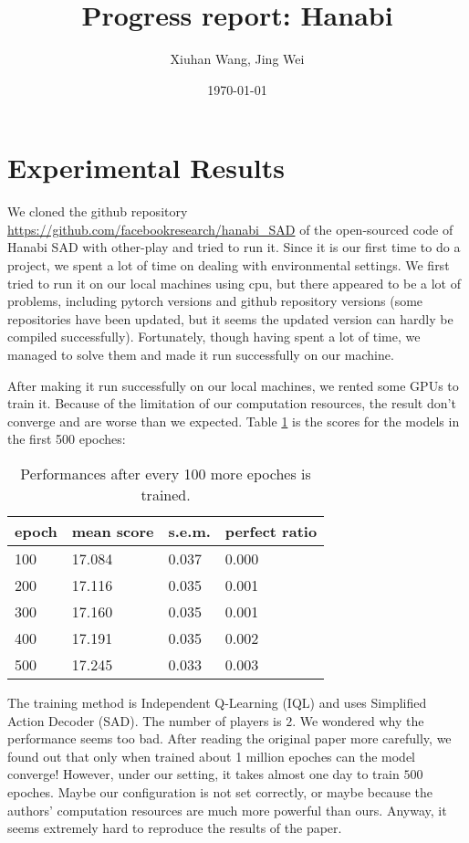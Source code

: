 \documentclass[12pt]{article}
\begin{document}
\title{\bf Progress report: Hanabi}
\author{Xiuhan Wang, Jing Wei}
\date{\today}
\maketitle

\section{Experimental Results}
We cloned the github repository \url{https://github.com/facebookresearch/hanabi_SAD} of the open-sourced code of Hanabi SAD with other-play \citep{hu2020other} and tried to run it. Since it is our first time to do a project, we spent a lot of time on dealing with environmental settings. We first tried to run it on our local machines using cpu, but there appeared to be a lot of problems, including pytorch versions and github repository versions (some repositories have been updated, but it seems the updated version can hardly be compiled successfully). Fortunately, though having spent a lot of time, we managed to solve them and made it run successfully on our machine.

After making it run successfully on our local machines, we rented some GPUs to train it. Because of the limitation of our computation resources, the result don't converge and are worse than we expected. Table \ref{Tab1} is the scores for the models in the first 500 epoches:
\begin{table}[H]
\begin{centering}
\begin{tabular}{|l|l|l|l|}
\hline
epoch & mean score & s.e.m. & perfect ratio \\ \hline
100 & 17.084 & 0.037 & 0.000 \\ \hline
200 & 17.116 & 0.035 & 0.001 \\ \hline  
300 & 17.160 & 0.035 & 0.001 \\ \hline
400 & 17.191 & 0.035 & 0.002 \\ \hline
500 & 17.245 & 0.033 & 0.003 \\ \hline
\end{tabular}
\caption{Performances after every 100 more epoches is trained.}
\label{Tab1}
\end{centering}
\end{table}

The training method is Independent Q-Learning (IQL) and uses Simplified Action Decoder (SAD). The number of players is $2$. We wondered why the performance seems too bad. After reading the original paper more carefully, we found out that only when trained about 1 million epoches can the model converge! However, under our setting, it takes almost one day to train $500$ epoches. Maybe our configuration is not set correctly, or maybe because the authors' computation resources are much more powerful than ours. Anyway, it seems extremely hard to reproduce the results of the paper.
\end{document}
